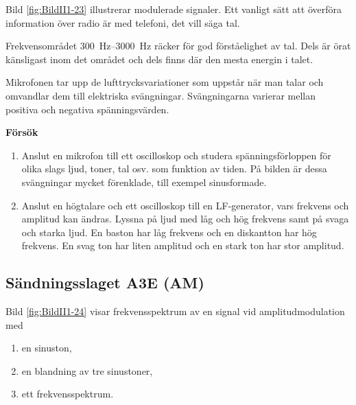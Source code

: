 Bild \ref{fig:BildII1-23} illustrerar modulerade signaler.
Ett vanligt sätt att överföra information över radio är med telefoni, det vill
säga tal.

Frekvensområdet \SIrange{300}{3000}{\hertz} räcker för god förståelighet av tal.
Dels är örat känsligast inom det området och dels finns där den mesta energin
i talet.

Mikrofonen tar upp de lufttrycksvariationer som uppstår när man talar och
omvandlar dem till elektriska svängningar.
Svängningarna varierar mellan positiva och negativa spänningsvärden.

\bigskip

\textbf{Försök}

\begin{enumerate}
\item Anslut en mikrofon till ett oscilloskop och studera spänningsförloppen
  för olika slags ljud, toner, tal osv. som funktion av tiden.
  På bilden är dessa svängningar mycket förenklade, till exempel sinusformade.

\item Anslut en högtalare och ett oscilloskop till en LF-generator, vars
frekvens och amplitud kan ändras. Lyssna på ljud med låg och hög frekvens samt
på svaga och starka ljud.
En baston har låg frekvens och en diskantton har hög frekvens.
En svag ton har liten amplitud och en stark ton har stor amplitud.
\end{enumerate}

\subsection{Sändningsslaget A3E (AM)}
\label{modulation_am}


Bild \ref{fig:BildII1-24} visar frekvensspektrum av en signal vid
amplitudmodulation med

\begin{enumerate}[label=\alph*.,noitemsep]
\item en sinuston,
\item en blandning av tre sinustoner,
\item ett frekvensspektrum.
\end{enumerate}

